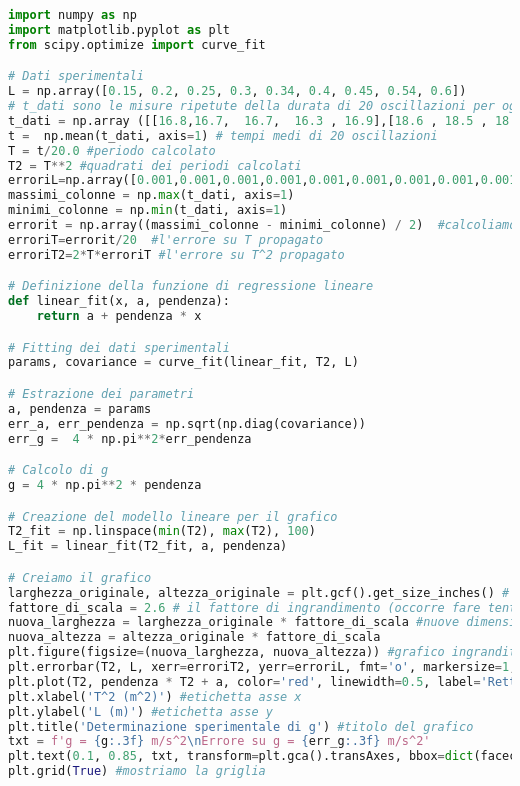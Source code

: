\documentclass{article}
\begin{document}
\begin{lstlisting}[language=Python]
import numpy as np
import matplotlib.pyplot as plt
from scipy.optimize import curve_fit

# Dati sperimentali
L = np.array([0.15, 0.2, 0.25, 0.3, 0.34, 0.4, 0.45, 0.54, 0.6])
# t_dati sono le misure ripetute della durata di 20 oscillazioni per ogni lunghezza
t_dati = np.array ([[16.8,16.7,  16.7,  16.3 , 16.9],[18.6 , 18.5 , 18.6 , 18.5, 18.7],[20.2 ,20.3 , 20.3 , 20.2, 20.4], [22.6, 22.6,  22.7 , 22.5,  22.8],[23.4 , 23.5 , 23.4 , 23.1 , 23.6],[25.8 ,25.7, 25.8,  25.9, 25.7],[27.9, 28.0, 28.0, 27.8, 27.7],[29.7, 29.7, 29.6,  29.8, 29.7,],[31.4,  31.5 , 31.5,  31.4, 31.3]])
t =  np.mean(t_dati, axis=1) # tempi medi di 20 oscillazioni
T = t/20.0 #periodo calcolato
T2 = T**2 #quadrati dei periodi calcolati
erroriL=np.array([0.001,0.001,0.001,0.001,0.001,0.001,0.001,0.001,0.001]) #errori sulle lunghezze (in metri)
massimi_colonne = np.max(t_dati, axis=1)
minimi_colonne = np.min(t_dati, axis=1)
errorit = np.array((massimi_colonne - minimi_colonne) / 2)  #calcoliamo l'array di errori ottenuti con la semidispersione
erroriT=errorit/20  #l'errore su T propagato
erroriT2=2*T*erroriT #l'errore su T^2 propagato

# Definizione della funzione di regressione lineare
def linear_fit(x, a, pendenza):
    return a + pendenza * x

# Fitting dei dati sperimentali
params, covariance = curve_fit(linear_fit, T2, L)

# Estrazione dei parametri
a, pendenza = params
err_a, err_pendenza = np.sqrt(np.diag(covariance))
err_g =  4 * np.pi**2*err_pendenza

# Calcolo di g
g = 4 * np.pi**2 * pendenza

# Creazione del modello lineare per il grafico
T2_fit = np.linspace(min(T2), max(T2), 100)
L_fit = linear_fit(T2_fit, a, pendenza)

# Creiamo il grafico
larghezza_originale, altezza_originale = plt.gcf().get_size_inches() # dimensioni originali del grafico (piccole)
fattore_di_scala = 2.6 # il fattore di ingrandimento (occorre fare tentativi per trovare quello giusto)
nuova_larghezza = larghezza_originale * fattore_di_scala #nuove dimensioni riscalate
nuova_altezza = altezza_originale * fattore_di_scala
plt.figure(figsize=(nuova_larghezza, nuova_altezza)) #grafico ingrandito
plt.errorbar(T2, L, xerr=erroriT2, yerr=erroriL, fmt='o', markersize=1, label='Dati con errori su x e y', color='black', ecolor='blue')  # barre di errore
plt.plot(T2, pendenza * T2 + a, color='red', linewidth=0.5, label='Retta di regressione')  # retta di regressione
plt.xlabel('T^2 (m^2)') #etichetta asse x
plt.ylabel('L (m)') #etichetta asse y
plt.title('Determinazione sperimentale di g') #titolo del grafico
txt = f'g = {g:.3f} m/s^2\nErrore su g = {err_g:.3f} m/s^2'
plt.text(0.1, 0.85, txt, transform=plt.gca().transAxes, bbox=dict(facecolor='white', alpha=0.5)) #risultato per g in un box informativo
plt.grid(True) #mostriamo la griglia


\end{lstlisting}
\end{document}
